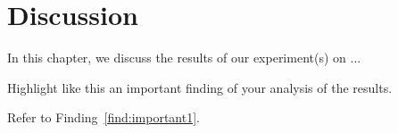 \chapter{Discussion}
\label{ch:discussion}
In this chapter, we discuss the results of our experiment(s) on ...

\begin{finding}
	Highlight like this an important finding of your analysis of the results.
	\label{find:important1}
\end{finding}

Refer to Finding~\ref{find:important1}.



